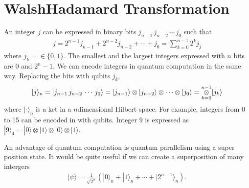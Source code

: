\documentclass[letterpaper,10pt,english]{jupyterBook}
\begin{document}
\section{Walsh\sphinxhyphen{}Hadamard Transformation}
\label{\detokenize{algorithms/walshhadamard:walsh-hadamard-transformation}}\label{\detokenize{algorithms/walshhadamard:sec-walsh-hadamard}}\label{\detokenize{algorithms/walshhadamard::doc}}
\sphinxAtStartPar
An integer \(j\) can be expressed in binary bits \(j_{n-1}\,j_{n-2}\,\cdots\,j_{0}\) such that
\begin{equation*}
\begin{split}
j = 2^{n-1} j_{n-1} + 2^{n-2} j_{n-2} + \cdots + j_0 = \sum_{k=0}^{n-1} 2^k j_j
\end{split}
\end{equation*}
\sphinxAtStartPar
where \(j_k = \in \{0,1\}\). The smallest and the largest integers expressed with \(n\) bits are \(0\) and \(2^{n}-1\).  We can encode integers in quantum computation in the same way.  Replacing the bits with qubits \(j_k\),
\begin{equation*}
\begin{split}
|j\rangle_n = |j_{n-1}\,j_{n-2}\,\cdots\,j_{0} \rangle = |j_{n-1} \rangle \otimes  |j_{n-2} \rangle \otimes \cdots \otimes |j_{0}\rangle = \underset{k=0}{\overset{n-1}{\Large\otimes}} |j_k\rangle
\end{split}
\end{equation*}
\sphinxAtStartPar
where \(|\cdot\rangle_n\) is a ket in a \(n\)\sphinxhyphen{}dimensional Hilbert space.
For example, integers from 0 to 15 can be encoded in with qubits. Integer \(9\) is expressed as \(|9\rangle_4 = |0\rangle \otimes |1\rangle \otimes |0\rangle \otimes |1\rangle\).

\sphinxAtStartPar
An advantage of quantum computation is quantum parallelism using a super position state. It would be quite useful if we can create a superposition of many intergers
\begin{equation*}
\begin{split}
|\psi\rangle = \frac{1}{\sqrt{2^n}}\left(|0\rangle_n + |1\rangle_n + \cdots + |2^{n-1}\rangle_n \right).
\end{split}
\end{equation*}
\end{document}
